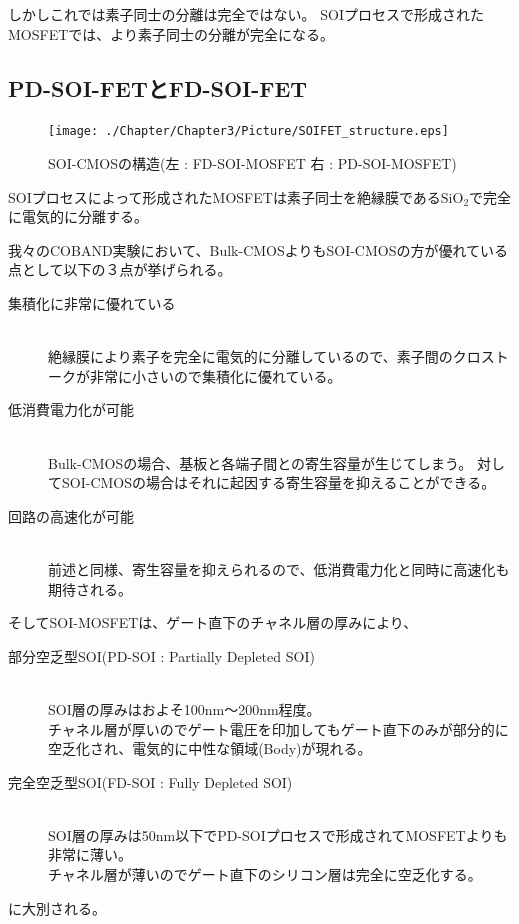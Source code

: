 		しかしこれでは素子同士の分離は完全ではない。
		SOIプロセスで形成されたMOSFETでは、より素子同士の分離が完全になる。
		
	\subsection{PD-SOI-FETとFD-SOI-FET}
		\begin{figure}[htbp]
			\begin{center}
				\texttt{[image: ./Chapter/Chapter3/Picture/SOIFET\_structure.eps]}
				\caption{SOI-CMOSの構造(左 : FD-SOI-MOSFET    右 : PD-SOI-MOSFET)}
				\label{fig:SOIFET_structure}
			\end{center}
		\end{figure}
		SOIプロセスによって形成されたMOSFETは素子同士を絶縁膜である$\mathrm{SiO_2}$で完全に電気的に分離する。
		
		我々のCOBAND実験において、Bulk-CMOSよりもSOI-CMOSの方が優れている点として以下の３点が挙げられる。
		\begin{description}
			\item[集積化に非常に優れている]\mbox{}\\
				絶縁膜により素子を完全に電気的に分離しているので、素子間のクロストークが非常に小さいので集積化に優れている。
			\item[低消費電力化が可能]\mbox{}\\
				Bulk-CMOSの場合、基板と各端子間との寄生容量が生じてしまう。
				対してSOI-CMOSの場合はそれに起因する寄生容量を抑えることができる。
			\item[回路の高速化が可能]\mbox{}\\
				前述と同様、寄生容量を抑えられるので、低消費電力化と同時に高速化も期待される。
		\end{description}
		そしてSOI-MOSFETは、ゲート直下のチャネル層の厚みにより、
		\begin{description}
		\item[部分空乏型SOI(PD-SOI : Partially Depleted SOI)]\mbox{}\\
			SOI層の厚みはおよそ100nm〜200nm程度。\\
			チャネル層が厚いのでゲート電圧を印加してもゲート直下のみが部分的に空乏化され、電気的に中性な領域(Body)が現れる。
		\item[完全空乏型SOI(FD-SOI : Fully Depleted SOI)]\mbox{}\\
			SOI層の厚みは50nm以下でPD-SOIプロセスで形成されてMOSFETよりも非常に薄い。\\
			チャネル層が薄いのでゲート直下のシリコン層は完全に空乏化する。
		\end{description}
		に大別される。
		
